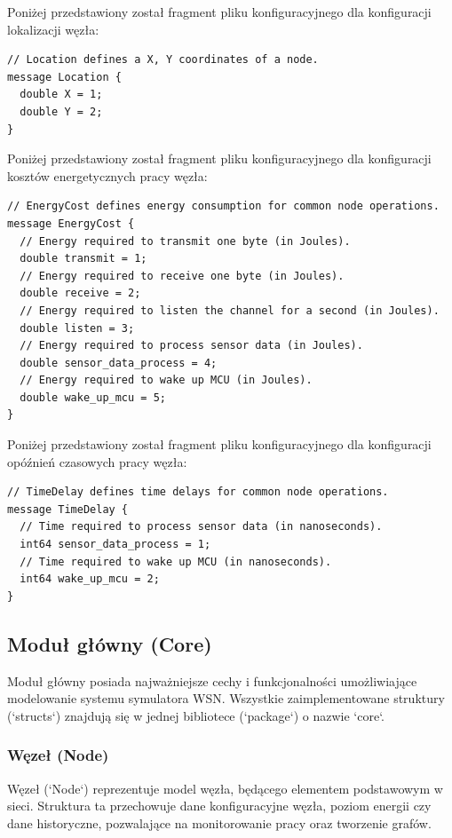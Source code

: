 \documentclass[a4paper,12pt,twoside,openany]{report}
\begin{document}
Poniżej przedstawiony został fragment pliku konfiguracyjnego dla konfiguracji lokalizacji węzła:

\begin{lstlisting}
// Location defines a X, Y coordinates of a node.
message Location {
  double X = 1;
  double Y = 2;
}
\end{lstlisting}

Poniżej przedstawiony został fragment pliku konfiguracyjnego dla konfiguracji kosztów energetycznych pracy węzła:

\begin{lstlisting}
// EnergyCost defines energy consumption for common node operations.
message EnergyCost {
  // Energy required to transmit one byte (in Joules).
  double transmit = 1;
  // Energy required to receive one byte (in Joules).
  double receive = 2;
  // Energy required to listen the channel for a second (in Joules).
  double listen = 3;
  // Energy required to process sensor data (in Joules).
  double sensor_data_process = 4;
  // Energy required to wake up MCU (in Joules).
  double wake_up_mcu = 5;
}
\end{lstlisting}

Poniżej przedstawiony został fragment pliku konfiguracyjnego dla konfiguracji opóźnień czasowych pracy węzła:

\begin{lstlisting}
// TimeDelay defines time delays for common node operations.
message TimeDelay {
  // Time required to process sensor data (in nanoseconds).
  int64 sensor_data_process = 1;
  // Time required to wake up MCU (in nanoseconds).
  int64 wake_up_mcu = 2;
}
\end{lstlisting}

\subsection{Moduł główny (Core)}

Moduł główny posiada najważniejsze cechy i funkcjonalności umożliwiające modelowanie systemu symulatora WSN.
Wszystkie zaimplementowane struktury (`structs`) znajdują się w jednej bibliotece (`package`) o nazwie `core`.

\subsubsection{Węzeł (Node)}

Węzeł (`Node`) reprezentuje model węzła, będącego elementem podstawowym w sieci. Struktura ta przechowuje dane konfiguracyjne węzła,
poziom energii czy dane historyczne, pozwalające na monitorowanie pracy oraz tworzenie grafów.
\end{document}
